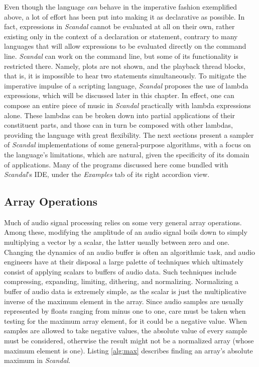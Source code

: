 \clearpage

Even though the language \emph{can} behave in the imperative fashion exemplified above, a lot of effort has been put into making it as declarative as possible. In fact, expressions in \emph{Scandal} cannot be evaluated at all on their own, rather existing only in the context of a declaration or statement, contrary to many languages that will allow expressions to be evaluated directly on the command line. \emph{Scandal} can work on the command line, but some of its functionality is restricted there. Namely, plots are not shown, and the playback thread blocks, that is, it is impossible to hear two  statements simultaneously. To mitigate the imperative impulse of a scripting language, \emph{Scandal} proposes the use of lambda expressions, which will be discussed later in this chapter. In effect, one can compose an entire piece of music in \emph{Scandal} practically with lambda expressions alone. These lambdas can be broken down into partial applications of their constituent parts, and those can in turn be composed with other lambdas, providing the language with great flexibility. The next sections present a sampler of \emph{Scandal} implementations of some general-purpose algorithms, with a focus on the language's limitations, which are natural, given the specificity of its domain of applications. Many of the programs discussed here come bundled with \emph{Scandal}'s IDE, under the \emph{Examples} tab of its right accordion view.

\subsection{Array Operations}

Much of audio signal processing relies on some very general array operations. Among these, modifying the amplitude of an audio signal boils down to simply multiplying a vector by a scalar, the latter usually between zero and one. Changing the dynamics of an audio buffer is often an algorithmic task, and audio engineers have at their disposal a large palette of techniques which ultimately consist of applying scalars to buffers of audio data. Such techniques include compressing, expanding, limiting, dithering, and normalizing. Normalizing a buffer of audio data is extremely simple, as the scalar is just the multiplicative inverse of the maximum element in the array. Since audio samples are usually represented by floats ranging from minus one to one, care must be taken when testing for the maximum array element, for it could be a negative value. When samples are allowed to take negative values, the absolute value of every sample must be considered, otherwise the result might not be a normalized array (whose maximum element is one). Listing \ref{alg:max} describes finding an array's absolute maximum in \emph{Scandal}.

